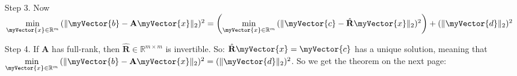 \documentclass{book}
\newenvironment{myIndent}{%
   \begin{adjustwidth}{2.5em}{0em}%
}{%
   \end{adjustwidth}%
}
\newenvironment{myDindent}{%
   \begin{adjustwidth}{5.0em}{0em}%
}{%
   \end{adjustwidth}%
}
\newcommand{\retTwo}{\hfill\bigbreak}
\newcommand{\mVec}[1]{\myVector{#1}}
\newcommand{\mMat}[1]{\mathbf{#1}}
\begin{document}
\begin{itemize}
{\begin{myIndent}
\begin{itemize}
{\begin{myDindent}
               \begin{myDindent}
                  \dots where $\mVec{c}, \hat{\mMat{R}}\mVec{x} \in \mathbb{R}^m$ and $\mVec{d} \in \mathbb{R}^{n-m}$  \retTwo
               \end{myDindent}
            \end{myDindent}}
            $(\|\mMat{Q}^T\mVec{b} - \mMat{R}\mVec{x}\|_2)^2 = \left(\left\|
            \begin{bmatrix}
               \mVec{c} \\ \mVec{d}
            \end{bmatrix} - 
            \begin{bmatrix}
               \hat{\mMat{R}}\mVec{x} \\ \mVec{0}
            \end{bmatrix}\right\|_2\right)^2 = \left\| 
            \begin{bmatrix}
               \mVec{c} - \hat{\mMat{R}}\mVec{x} \\ \mVec{d}
            \end{bmatrix}\right\|_2^{\phantom{2}2}$\newline
            
            $\hphantom{(\|\mMat{Q}^T\mVec{b} - \mMat{R}\mVec{x}\|_2)^2 = \left(\left\|
               \begin{bmatrix}
                  \mVec{c} \\ \mVec{d}
               \end{bmatrix} - 
               \begin{bmatrix}
                  \hat{\mMat{R}}\mVec{x} \\ \mVec{0}
               \end{bmatrix}\right\|_2\right)^2}
            = (\|\mVec{c} - \hat{\mMat{R}}\mVec{x}\|_2)^2 + (\|\mVec{d}\|_2)^2$ \retTwo
            
            \item[{\color{BrickRed}Step 3.}] Now $\min\limits_{\mVec{x} \in \mathbb{R}^m}{(\|\mVec{b} - \mMat{A}\mVec{x}\|_2)^2} = \left(\min\limits_{\mVec{x} \in \mathbb{R}^m}{(\|\mVec{c} - \hat{\mMat{R}}\mVec{x}\|_2)^2}\right) + (\|\mVec{d}\|_2)^2$ \retTwo
            
            \item[{\color{BrickRed}Step 4.}] If $\mMat{A}$ has full-rank, then $\hat{\mMat{R}} \in \mathbb{R}^{m\times m}$ is invertible. So: $\hat{\mMat{R}}\mVec{x} = \mVec{c}$ has a unique solution, meaning that $\min\limits_{\mVec{x} \in \mathbb{R}^m}{(\|\mVec{b} - \mMat{A}\mVec{x}\|_2)^2} = (\|\mVec{d}\|_2)^2$. So we get the theorem on the next page:
         \end{itemize}


\end{myIndent}}
\end{itemize}
\end{document}
